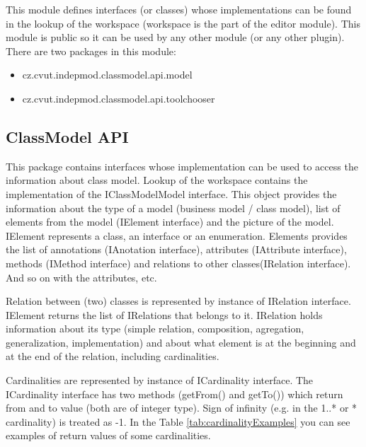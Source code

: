 This module defines interfaces (or classes) whose implementations can be found in the lookup of the workspace (workspace is the part of the editor module). This module is public so it can be used by any other module (or any other plugin). There are two packages in this module:

\begin{itemize}
    \item cz.cvut.indepmod.classmodel.api.model
    \item cz.cvut.indepmod.classmodel.api.toolchooser
\end{itemize}

\subsection{ClassModel API}
\label{section:classModelAPI}

This package contains interfaces whose implementation can be used to access the information about class model. Lookup of the workspace contains the implementation of the IClassModelModel interface. This object provides the information about the type of a model (business model / class model), list of elements from the model (IElement interface) and the picture of the model. IElement represents a class, an interface or an enumeration. Elements provides the list of annotations (IAnotation interface), attributes (IAttribute interface), methods (IMethod interface) and relations to other classes(IRelation interface). And so on with the attributes, etc. 

Relation between (two) classes is represented by instance of IRelation interface. IElement returns the list of IRelations that belongs to it. IRelation holds information about its type (simple relation, composition, agregation, generalization, implementation) and about what element is at the beginning and at the end of the relation, including cardinalities. 

Cardinalities are represented by instance of ICardinality interface. The ICardinality interface has two methods (getFrom() and getTo()) which return from and to value (both are of integer type). Sign of infinity (e.g. in the 1..* or * cardinality) is treated as -1. In the Table \ref{tab:cardinalityExamples} you can see examples of return values of some cardinalities.

